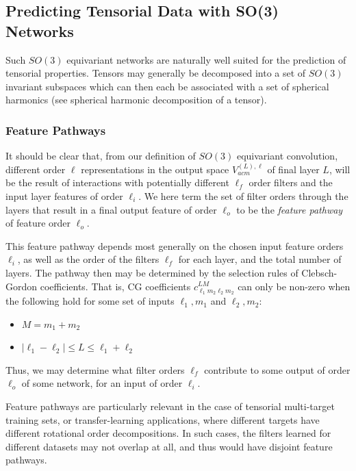 \documentclass[10pt,a4paper]{article}
\begin{document}
\subsection{Predicting Tensorial Data with SO(3) Networks}
Such $SO(3)$ equivariant networks are naturally well suited for the prediction of tensorial properties. Tensors may generally be decomposed into a set of $SO(3)$ invariant subspaces which can then each be associated with a set of spherical harmonics (see spherical harmonic decomposition of a tensor).

\subsubsection{Feature Pathways}
It should be clear that, from our definition of $SO(3)$ equivariant convolution, different order $\ell$ representations in the output space $V^{(L), \ell}_{acm}$ of final layer $L$, will be the result of interactions with potentially different $\ell_f$ order filters and the input layer features of order $\ell_i$. We here term the set of filter orders through the layers that result in a final output feature of order $\ell_o$ to be the \textit{feature pathway} of feature order $\ell_o$.

This feature pathway depends most generally on the chosen input feature orders $\ell_i$, as well as the order of the filters  $\ell_f$ for each layer, and the total number of layers. The pathway then may be determined by the selection rules of Clebsch-Gordon coefficients. That is, CG coefficients $c^{LM}_{\ell_1m_2\ell_2m_2}$ can only be non-zero when the following hold for some set of inputs $\ell_1,m_1$ and $\ell_2, m_2$:
\begin{itemize}
\item $M=m_1+m_2$
\item $|\ell_1-\ell_2|\leq L\leq \ell_1+\ell_2$
\end{itemize}
Thus, we may determine what filter orders $\ell_f$ contribute to some output of order $\ell_o$ of some network, for an input of order $\ell_i$.

Feature pathways are particularly relevant in the case of tensorial multi-target training sets, or transfer-learning applications, where different targets have different rotational order decompositions. In such cases, the filters learned for different datasets may not overlap at all, and thus would have disjoint feature pathways. 
\end{document}
